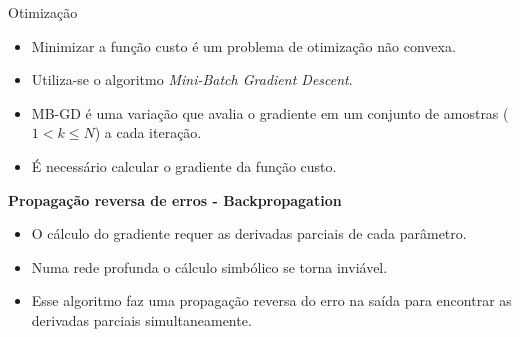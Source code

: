 \begin{frame}{Otimização}
	\begin{itemize}
		\item Minimizar a função custo é um problema de otimização não convexa.
		\item Utiliza-se o algoritmo \emph{Mini-Batch Gradient Descent}.
		\item MB-GD é uma variação que avalia o gradiente em um conjunto de amostras ($1 < k \leq N$) a cada iteração.
		\item É necessário calcular o gradiente da função custo.
	\end{itemize}

	\pause

	\textbf{Propagação reversa de erros - Backpropagation} \\
	\begin{itemize}
		\item O cálculo do gradiente requer as derivadas parciais de cada parâmetro.
		\item Numa rede profunda o cálculo simbólico se torna inviável.
		\item Esse algoritmo faz uma propagação reversa do erro na saída para encontrar as derivadas parciais simultaneamente.
	\end{itemize}
\end{frame}

